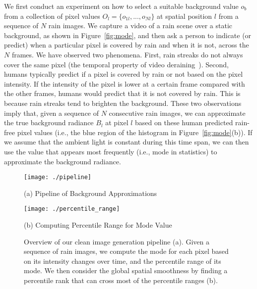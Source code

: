 \documentclass[10pt,twocolumn,letterpaper]{article}
\begin{document}
We first conduct an experiment on how to select a suitable background value $o_b$ from a collection of pixel values $O_l = \{ o_{1l},...,o_{Nl}\}$ at spatial position $l$ from a sequence of $N$ rain images. We capture a video of a rain scene over a static background, as shown in Figure~\ref{fig:mode}, and then ask a person to indicate (or predict) when a particular pixel is covered by rain and when it is not, across the $N$ frames. We have observed two phenomena.
First, rain streaks do not always cover the same pixel (the temporal property of video deraining~\cite{zhang:icme:2006:temporal}).
Second, humans typically predict if a pixel is covered by rain or not based on the pixel intensity. If the intensity of the pixel is lower at a certain frame compared with the other frames, humans would predict that it is not covered by rain. This is because rain streaks tend to brighten the background. These two observations imply that, given a sequence of $N$ consecutive rain images, we can approximate the true background radiance $B_{l}$ at pixel $l$ based on these human predicted rain-free pixel values (i.e., the blue region of the histogram in Figure~\ref{fig:mode}(b)). If we assume that the ambient light is constant during this time span, we can then use the value that appears most frequently (i.e., mode in statistics) to approximate the background radiance.



\begin{figure*}[ht]
\begin{minipage}[t]{0.67\textwidth}
\centering
\texttt{[image: ./pipeline]}
\centerline{\footnotesize (a) Pipeline of Background Approximations}
\end{minipage}
\begin{minipage}[t]{0.32\textwidth}
\centering
\texttt{[image: ./percentile\_range]}
\centerline{\footnotesize (b) Computing Percentile Range for Mode Value}
\end{minipage}
\vspace{0.05in}
\caption{Overview of our clean image generation pipeline (a). Given a sequence of rain images, we compute the mode for each pixel based on its intensity changes over time, and the percentile range of its mode. We then consider the global spatial smoothness by finding a percentile rank that can cross most of the percentile ranges (b).}
	\label{fig:sapf}
	\vspace{-3mm}
\end{figure*}
\end{document}
